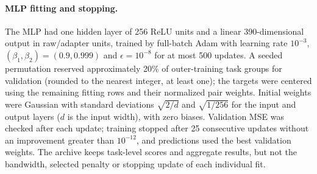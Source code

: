 \paragraph{MLP fitting and stopping.}
The MLP had one hidden layer of 256 ReLU units and a linear 390-dimensional output in raw/adapter units, trained by full-batch Adam with learning rate $10^{-3}$, $(\beta_1,\beta_2)=(0.9,0.999)$ and $\epsilon=10^{-8}$ for at most 500 updates.
A seeded permutation reserved approximately 20\% of outer-training task groups for validation (rounded to the nearest integer, at least one); the targets were centered using the remaining fitting rows and their normalized pair weights.
Initial weights were Gaussian with standard deviations $\sqrt{2/d}$ and $\sqrt{1/256}$ for the input and output layers ($d$ is the input width), with zero biases.
Validation MSE was checked after each update; training stopped after 25 consecutive updates without an improvement greater than $10^{-12}$, and predictions used the best validation weights.
The archive keeps task-level scores and aggregate results, but not the bandwidth, selected penalty or stopping update of each individual fit.
